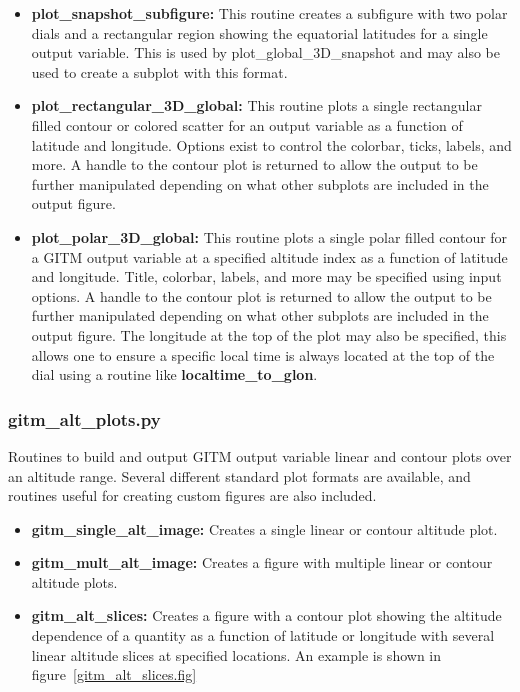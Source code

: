 \begin{itemize}
\item[]{{\bf plot\_snapshot\_subfigure:}  This routine creates a subfigure with two polar dials and a rectangular region showing the equatorial latitudes for a single output variable.  This is used by plot\_global\_3D\_snapshot and may also be used to create a subplot with this format.}
\item[]{{\bf plot\_rectangular\_3D\_global:} This routine plots a single rectangular filled contour or colored scatter for an output variable as a function of latitude and longitude.  Options exist to control the colorbar, ticks, labels, and more.  A handle to the contour plot is returned to allow the output to be further manipulated depending on what other subplots are included in the output figure.} 
\item[]{{\bf plot\_polar\_3D\_global:} This routine plots a single polar filled contour for a GITM output variable at a specified altitude index as a function of latitude and longitude.  Title, colorbar, labels, and more may be specified using input options.  A handle to the contour plot is returned to allow the output to be further manipulated depending on what other subplots are included in the output figure.  The longitude at the top of the plot may also be specified, this allows one to ensure a specific local time is always located at the top of the dial using a routine like {\bf localtime\_to\_glon}.} 
\end{itemize}

\subsubsection{gitm\_alt\_plots.py}

Routines to build and output GITM output variable linear and contour plots over an altitude range.  Several different standard plot formats are available, and routines useful for creating custom figures are also included.

\begin{itemize}
\item[]{{\bf gitm\_single\_alt\_image:}  Creates a single linear or contour altitude plot.}
\item[]{{\bf gitm\_mult\_alt\_image:}  Creates a figure with multiple linear or contour altitude plots.}
\item[]{{\bf gitm\_alt\_slices:}  Creates a figure with a contour plot showing the altitude dependence of a quantity as a function of latitude or longitude with several linear altitude slices at specified locations.  An example is shown in figure~\ref{gitm_alt_slices.fig}}
\end{itemize}

